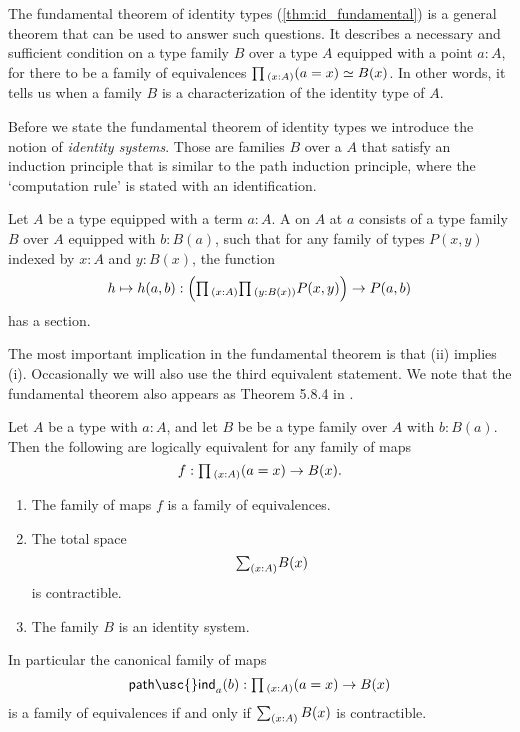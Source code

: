 The fundamental theorem of identity types (\cref{thm:id_fundamental}) is a general theorem that can be used to answer such questions. It describes a necessary and sufficient condition on a type family $B$ over a type $A$ equipped with a point $a:A$, for there to be a family of equivalences $\prd{x:A}(a=x)\simeq B(x)$. In other words, it tells us when a family $B$ is a characterization of the identity type of $A$.

Before we state the fundamental theorem of identity types we introduce the notion of \emph{identity systems}. Those are families $B$ over a $A$ that satisfy an induction principle that is similar to the path induction principle, where the `computation rule' is stated with an identification.

\begin{defn}
  Let $A$ be a type equipped with a term $a:A$. A  on $A$ at $a$ consists of a type family $B$ over $A$ equipped with $b:B(a)$, such that for any family of types $P(x,y)$ indexed by $x:A$ and $y:B(x)$,
  the function
  \begin{equation*}
    h\mapsto h(a,b):\Big(\prd{x:A}{y:B(x)}P(x,y)\Big)\to P(a,b)
  \end{equation*}
  has a section.
\end{defn}

The most important implication in the fundamental theorem is that (ii) implies (i). Occasionally we will also use the third equivalent statement. We note that the fundamental theorem also appears as Theorem 5.8.4 in \cite{hottbook}.

\begin{thm}\label{thm:id_fundamental}
Let $A$ be a type with $a:A$, and let $B$ be be a type family over $A$ with $b:B(a)$.
Then  the following are logically equivalent for any family of maps
\begin{equation*}
  f:\prd{x:A}(a=x)\to B(x).
\end{equation*}
\begin{enumerate}
\item The family of maps $f$ is a family of equivalences.
\item The total space
\begin{equation*}
\sm{x:A}B(x)
\end{equation*}
is contractible.
\item The family $B$ is an identity system.
\end{enumerate}
In particular the canonical family of maps
\begin{equation*}
\mathsf{path\usc{}ind}_a(b):\prd{x:A} (a=x)\to B(x)
\end{equation*}
is a family of equivalences if and only if $\sm{x:A}B(x)$ is contractible.
\end{thm}

